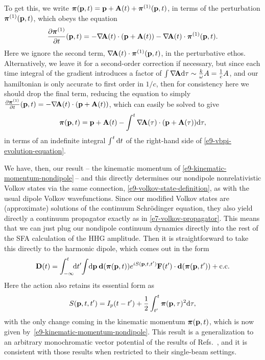 
To get this, we write $\boldsymbol{\pi}(\vb{p},t) = \vb{p} + \vb{A}(t) +\boldsymbol{\pi}^{(1)}(\vb{p},t)$, in terms of the perturbation $\boldsymbol{\pi}^{(1)}(\vb{p},t)$, which obeys the equation
\begin{equation}
\frac{\partial\boldsymbol{\pi}^{(1)}}{\partial t}(\vb{p},t)
=
-\nabla\!\vb{A}(t)\cdot \left(\vb{p} + \vb{A}(t) \right)
-\nabla\!\vb{A}(t)\cdot \boldsymbol{\pi}^{(1)}(\vb{p},t)
.
\end{equation}
Here we ignore the second term, $\nabla\!\vb{A}(t)\cdot \boldsymbol{\pi}^{(1)}(\vb{p},t)$, in the perturbative ethos. Alternatively, we leave it for a second-order correction if necessary, but since each time integral of the gradient introduces a factor of $\int\nabla\!\vb{A}\mathrm{d}\tau \sim \frac{k}{\omega}A= \frac{1}{c}A$, and our hamiltonian is only accurate to first order in $1/c$, then for consistency here we should drop the final term, reducing the equation to simply $\frac{\partial\boldsymbol{\pi}^{(1)}}{\partial t}(\vb{p},t) = -\nabla\!\vb{A}(t)\cdot \left(\vb{p} + \vb{A}(t) \right)$, which can easily be solved to give
\begin{equation}
\boldsymbol{\pi}(\vb{p},t)=\vb{p}+\vb{A}(t)-\int^t\nabla\!\vb{A}(\tau) \cdot (\vb{p}+\vb{A}(\tau))\mathrm{d}\tau,
\label{e9-kinematic-momentum-nondipole}
\end{equation}
in terms of an indefinite integral $\int^t\mathrm{d} t$ of the right-hand side of \eqref{e9-vbpi-evolution-equation}. 


We have, then, our result -- the kinematic momentum of \eqref{e9-kinematic-momentum-nondipole}\,-- and this directly determines our nondipole nonrelativistic Volkov states via the same connection, \eqref{e9-volkov-state-definition}, as with the usual dipole Volkov wavefunctions. Since our modified Volkov states are (approximate) solutions of the continuum Schrödinger equation, they also yield directly a continuum propagator exactly as in \eqref{e7-volkov-propagator}. This means that we can just plug our nondipole continuum dynamics directly into the rest of the SFA calculation of the HHG amplitude. Then it is straightforward to take this directly to the harmonic dipole, which comes out in the form
\begin{equation}
\vb D(t)
=
\int_{-\infty}^t \!\!\mathrm{d} t'\!
\int\!\mathrm{d}\vb{p}\:
\vb{d}(\boldsymbol{\pi}(\vb{p},t))
e^{iS(\vb{p},t,t')}
\vb{F}(t')\cdot\vb{d}(\boldsymbol{\pi}(\vb{p},t'))
+\mathrm{c.c.}
\label{e9-initial-harmonic-dipole}
\end{equation}
Here the action also retains its essential form as
\begin{equation}
S(\vb{p},t,t')=I_p(t-t')+\frac12 \int_{t'}^t \boldsymbol{\pi}(\vb{p},\tau)^2\mathrm{d}\tau
,
\label{e9-initial-action}
\end{equation}
with the only change coming in the kinematic momentum $\boldsymbol{\pi}(\vb{p},t)$, which is now given by~\eqref{e9-kinematic-momentum-nondipole}. This result is a generalization to an arbitrary monochromatic vector potential of the results of Refs.~\citealp{ kylstra_photon_2001, kylstra_photon_2002, chirila_analysis_2004, chirila_nondipole_2002}, and it is consistent with those results when restricted to their single-beam settings.



